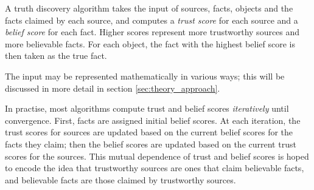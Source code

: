 \documentclass[../main.tex]{subfiles}
\begin{document}
A truth discovery algorithm takes the input of sources, facts, objects and the
facts claimed by each source, and computes a \emph{trust score} for each source
and a \emph{belief score} for each fact. Higher scores represent more
trustworthy sources and more believable facts\footnotemark. For each object,
the fact with the highest belief score is then taken as the true fact.


The input may be represented mathematically in various ways; this will be
discussed in more detail in section \ref{sec:theory_approach}. 

In practise, most algorithms compute trust and belief scores \emph{iteratively}
until convergence. First, facts are assigned initial belief scores. At each
iteration, the trust scores for sources are updated based on the current belief
scores for the facts they claim; then the belief scores are updated based on the
current trust scores for the sources. This mutual dependence of trust and
belief scores is hoped to encode the idea that trustworthy sources are ones
that claim believable facts, and believable facts are those claimed by
trustworthy sources.
\end{document}
